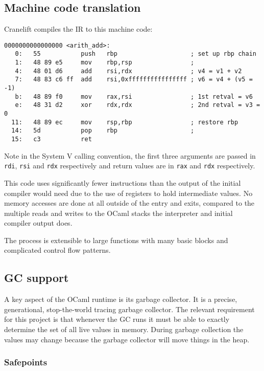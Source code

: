 \subsection{Machine code translation}

Cranelift compiles the IR to this machine code:

\begin{verbatim}
0000000000000000 <arith_add>:
   0:	55           push   rbp                    ; set up rbp chain
   1:	48 89 e5     mov    rbp,rsp                ;  
   4:	48 01 d6     add    rsi,rdx                ; v4 = v1 + v2
   7:	48 83 c6 ff  add    rsi,0xffffffffffffffff ; v6 = v4 + (v5 = -1)
   b:	48 89 f0     mov    rax,rsi                ; 1st retval = v6
   e:	48 31 d2     xor    rdx,rdx                ; 2nd retval = v3 = 0
  11:	48 89 ec     mov    rsp,rbp                ; restore rbp
  14:	5d           pop    rbp                    ;
  15:	c3           ret    
\end{verbatim}

Note in the System V calling convention, the first three arguments are passed in \texttt{rdi},
\texttt{rsi} and \texttt{rdx} respectively and return values are in \texttt{rax} and
\texttt{rdx} respectively.

This code uses significantly fewer instructions than the output of the initial compiler would need
due to the use of registers to hold intermediate values. No memory accesses are
done at all outside of the entry and exits, compared to the multiple reads and writes to the OCaml
stacks the interpreter and initial compiler output does.

The process is extensible to large functions with many basic blocks and complicated control flow
patterns.

\subsection{GC support} \label{gc-support}

A key aspect of the OCaml runtime is its garbage collector. It is a precise, generational,
stop-the-world tracing garbage collector. The relevant requirement for this project is that
whenever
the GC runs it must be able to exactly determine the set of all live values in memory. During
garbage collection the values may change because the garbage collector will move things in the
heap.

\subsubsection{Safepoints}

